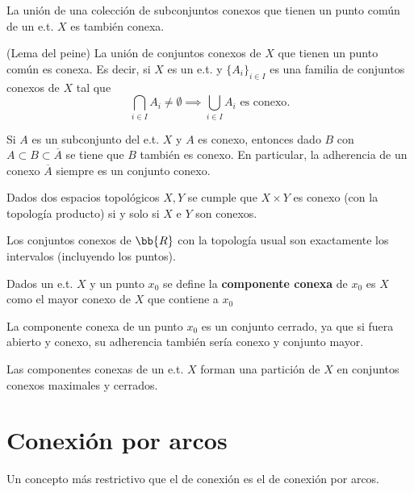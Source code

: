 \begin{teo}
    La unión de una colección de subconjuntos conexos que tienen un punto común de un e.t. $X$ es también conexa.
\end{teo}

\begin{teo}(Lema del peine)
    La unión de conjuntos conexos de $X$ que tienen un punto común es conexa. Es decir, si $X$ es un e.t. y $\{A_i\}_{i\in I}$ es una familia de conjuntos conexos de $X$ tal que 
    $$\bigcap\limits_{i\in I}A_i \neq \emptyset \implies \bigcup\limits_{i\in I}A_i \text{ es conexo}.$$
\end{teo}

\begin{teo}
    Si $A$ es un subconjunto del e.t. $X$ y $A$ es conexo, entonces dado $B$ con $A\subset B\subset\overline{A}$ se tiene que $B$ también es conexo. En particular, la adherencia de un conexo $\overline{A}$ siempre es un conjunto conexo.
\end{teo}

\begin{teo}
    Dados dos espacios topológicos $X,Y$ se cumple que $X\times Y$ es conexo (con la topología producto) si y solo si $X$ e $Y$ son conexos.
\end{teo}

\begin{teo}
    Los conjuntos conexos de $\bb{R}$ con la topología usual son exactamente los intervalos (incluyendo los puntos).
\end{teo}

\begin{definicion}
    Dados un e.t. $X$ y un punto $x_0$ se define la \textbf{componente conexa} de $x_0$ es $X$ como el mayor conexo de $X$ que contiene a $x_0$
\end{definicion}

\begin{observacion}
    La componente conexa de un punto $x_0$ es un conjunto cerrado, ya que si fuera abierto y conexo, su adherencia también sería conexo y conjunto mayor.
\end{observacion}

\begin{teo}
    Las componentes conexas de un e.t. $X$ forman una partición de $X$ en conjuntos conexos maximales y cerrados.
\end{teo}

\section{Conexión por arcos}
\noindent
Un concepto más restrictivo que el de conexión es el de conexión por arcos. 

